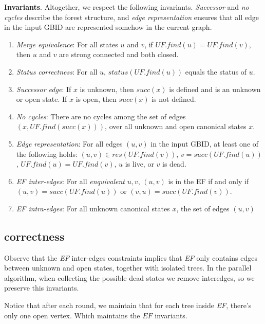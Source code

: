 \textbf{Invariants}. Altogether, we respect the following invariants. \textsl{Successor} and \textsl{no cycles} describe the forest structure, and \textsl{edge representation} ensures that all edge in the input GBID are represented somehow in the current graph.

\begin{enumerate}
    \item \textsl{Merge equivalence}: For all states $u$ and $v$, if $UF.find(u)=UF.find(v)$, then $u$ and $v$ are strong connected and both closed.
    \item \textsl{Status correctness}: For all $u$, $status(UF.find(u))$ equals the status of $u$.
    \item \textsl{Successor edge}: If $x$ is unknown, then $succ(x)$ is defined and is an unknown or open state. If $x$ is open, then $succ(x)$ is not defined.
    \item \textsl{No cycles}: There are no cycles among the set of edges $(x, UF.find(succ(x)))$, over all unknown and open canonical states $x$.
    \item \textsl{Edge representation}: For all edges $(u,v)$ in the input GBID, at least one of the following holds: $(u,v)\in res(UF.find(v))$, $v=succ(UF.find(u))$, $UF.find(u)=UF.find(v)$, $u$ is live, or $v$ is dead.
    \item \textsl{EF inter-edges}: For all \textsl{enquivalent} $u,v$, $(u,v)$ is in the EF if and only if $(u,v)=succ(UF.find(u))$ or $(v,u)=succ(UF.find(v))$.
    \item \textsl{EF intra-edges}: For all unknown canonical states $x$, the set of edges $(u,v)$ 
\end{enumerate}

\subsection{correctness}

Observe that the \textsl{EF} inter-edges constraints implies that \textsl{EF} only contains edges between unknown and open states, together with isolated trees. In the parallel algorithm, when collecting the possible dead states we remove interedges, so we preserve this invariants.

Notice that after each round, we maintain that for each tree inside \textsl{EF}, there's only one open vertex. Which maintains the $EF$ invariants.